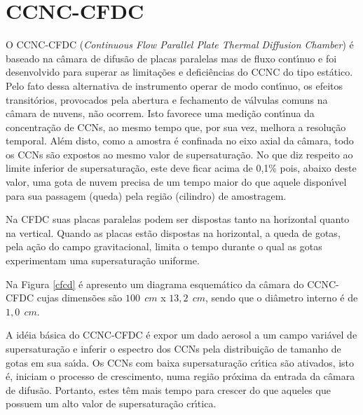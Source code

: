

\section{CCNC-CFDC}

O CCNC-CFDC (\textit{Continuous Flow Parallel Plate Thermal Diffusion Chamber}) \'{e} baseado na c\^{a}mara de difus\~{a}o de placas paralelas mas de fluxo cont\'{\i}nuo \cite{Sinnarwalla} e foi desenvolvido para
superar as limita\c{c}\~{o}es e defici\^{e}ncias do CCNC do tipo est\'{a}tico. Pelo fato dessa alternativa de
instrumento operar de modo cont\'{\i}nuo, os efeitos transit\'{o}rios,
provocados pela abertura e fechamento de v\'{a}lvulas comuns na c\^{a}mara de nuvens,
n\~{a}o ocorrem. Isto favorece uma medi\c{c}\~{a}o cont\'{\i}nua da concentra\c{c}\~{a}o de CCNs, ao mesmo tempo que, por sua vez, melhora a resolu\c{c}\~{a}o temporal. Al\'{e}m disto, como a amostra \'{e} confinada no eixo axial
da c\^{a}mara, todo os CCNs s\~{a}o expostos ao mesmo valor de supersatura\c{c}\~{a}o. No
que diz respeito ao limite inferior de  supersatura\c{c}\~{a}o,  este deve
ficar acima de 0,1\% pois, abaixo deste valor, uma gota de nuvem precisa
de um tempo maior do que aquele dispon\'{\i}vel para sua passagem (queda) pela regi\~{a}o (cilindro) de amostragem.

Na CFDC suas placas paralelas podem ser dispostas tanto na horizontal quanto na vertical. Quando as placas est\~{a}o dispostas na horizontal, a queda de gotas, pela a\c{c}\~{a}o do campo gravitacional, limita
o tempo durante o qual as gotas experimentam uma supersatura\c{c}\~{a}o uniforme.


Na Figura \ref{cfcd} \'{e} apresento um diagrama esquem\'{a}tico da c\^{a}mara do CCNC-CFDC cujas dimens\~{o}es s\~{a}o $ 100\ \ cm$ x $13,2\ \ cm$,  sendo que o di\^{a}metro  interno \'{e} de $1,0\ \ cm$.


A id\'{e}ia b\'{a}sica do CCNC-CFDC  \'{e} expor um dado aerosol a um campo vari\'{a}vel de supersatura\c{c}\~{a}o
e inferir o espectro dos CCNs pela distribui\c{c}\~{a}o de tamanho de gotas em
sua sa\'{\i}da. Os CCNs com baixa supersatura\c{c}\~{a}o cr\'{\i}tica s\~{a}o ativados, isto \'{e},
iniciam o processo de crescimento, numa regi\~{a}o pr\'{o}xima da entrada da c\^{a}mara de difus\~{a}o. Portanto, estes t\^{e}m mais tempo para crescer do que aqueles que possuem um alto valor de supersatura\c{c}\~{a}o
cr\'{\i}tica.

